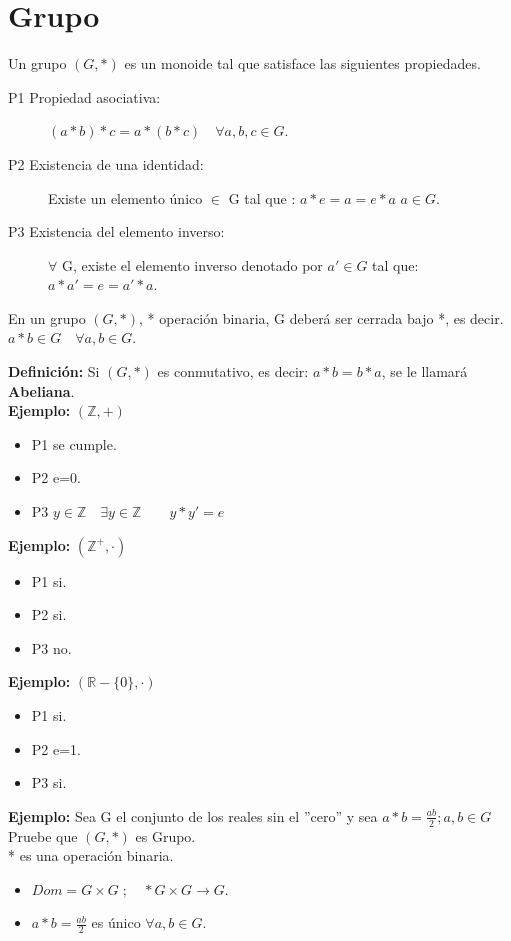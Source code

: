 \chapter{Grupo}

Un grupo $(G,*)$ es un monoide tal que satisface las siguientes propiedades.
\begin{description}
\item [P1 Propiedad asociativa: ]$(a*b)*c= a*(b*c)\quad \forall a,b,c \in G$.
\item [P2 Existencia de una identidad: ]Existe un elemento único $\in$ G tal que :
	$a*e=a=e*a$ $a\in G$.
\item [P3 Existencia del elemento inverso: ]$\forall$ G, existe el elemento inverso denotado por  $a' \in G$ tal que:
$a*a'=e=a'*a$.
\end{description}

En un grupo $(G,*)$, * operación binaria, G deberá ser cerrada bajo *, es decir.
$a*b \in G \quad \forall a,b \in G$.

\textbf{Definición: }Si $(G,*)$ es conmutativo, es decir: $a*b=b*a$, se le llamará \textbf{Abeliana}.\\

\textbf{Ejemplo: }$(\mathds{Z},+)$
\begin{itemize}
\item P1 se cumple.
\item P2 e=0.
\item P3 $y\in \mathds{Z} \quad \exists y\in \mathds{Z} \quad \quad y*y'=e$
\end{itemize}

\textbf{Ejemplo: }$(\mathds{Z}^+,\cdot)$
\begin{itemize}
\item P1 si.
\item P2 si.
\item P3 no.
\end{itemize}

\textbf{Ejemplo: }$(\mathds{R}-\lbrace 0 \rbrace,\cdot)$
\begin{itemize}
\item P1 si.
\item P2 e=1.
\item P3 si.
\end{itemize}

\textbf{Ejemplo: }Sea G el conjunto de los reales sin el ''cero'' y sea $a*b=\frac{ab}{2}; a,b\in G$ Pruebe que $(G,*)$ es Grupo.\\
* es una operación binaria.
\begin{itemize}
\item $Dom=G\times G \; ; \quad *G\times G \rightarrow G$.
\item $a*b= \frac{ab}{2}$ es único $\forall a,b\in G$.
\end{itemize}

